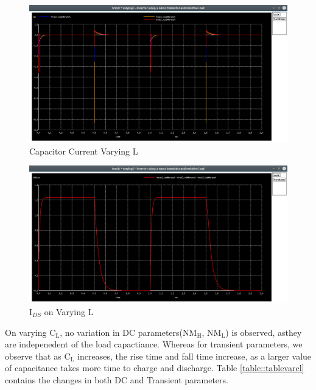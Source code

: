 \documentclass[12pt]{article}
\begin{document}
	\begin{figure}[H]
		\begin{center}
			\includegraphics[scale=0.25]{images/inverter_l_vcap.png}
			\caption{Capacitor Current Varying L}
			\label{fig::varying_l_vcap}
		\end{center}
	\end{figure}
	\begin{figure}[H]
		\begin{center}
			\includegraphics[scale=0.25]{images/inverter_l_vdd.png}
			\caption{$\text{I}_{DS}$ on Varying L}
			\label{fig::varying_l_vdd}
		\end{center}
	\end{figure}
	On varying $\text{C}_\text{L}$, no variation in DC parameters($\text{NM}_\text{H}$, $\text{NM}_\text{L}$) is observed, asthey are indepenedent of the load capactiance. Whereas for transient parameters, we observe that as $\text{C}_\text{L}$ increases, the rise time and fall time increase, as a larger value of capacitance takes more time to charge and discharge. Table \ref{table::tablevarcl} contains the changes in both DC and Transient parameters.
\end{document}
